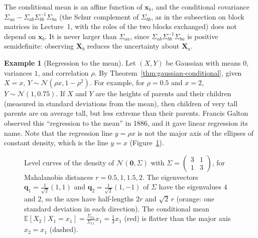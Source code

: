 \documentclass[11pt]{article}
\newcommand{\E}{\mathbb{E}}
\theoremstyle{definition}
\newtheorem{example}[definition]{Example}
\theoremstyle{plain}
\theoremstyle{remark}
\begin{document}
The conditional mean is an affine function of $\mathbf{x}_b$, and the conditional covariance $\Sigma_{aa} - \Sigma_{ab}\Sigma_{bb}^{-1}\Sigma_{ba}$ (the Schur complement of $\Sigma_{bb}$, as in the subsection on block matrices in Lecture~1, with the roles of the two blocks exchanged) does not depend on $\mathbf{x}_b$. It is never larger than $\Sigma_{aa}$, since $\Sigma_{ab}\Sigma_{bb}^{-1}\Sigma_{ba}$ is positive semidefinite: observing $\mathbf{X}_b$ reduces the uncertainty about $\mathbf{X}_a$.

\begin{example}[Regression to the mean]\label{ex:regression-to-mean}
    Let $(X, Y)$ be Gaussian with means $0$, variances $1$, and correlation $\rho$. By Theorem~\ref{thm:gaussian-conditional}, given $X = x$, $Y \sim \mathcal{N}(\rho x, 1 - \rho^2)$. For example, for $\rho = 0.5$ and $x = 2$, $Y \sim \mathcal{N}(1, 0.75)$. If $X$ and $Y$ are the heights of parents and their children (measured in standard deviations from the mean), then children of very tall parents are on average tall, but less extreme than their parents. Francis Galton observed this ``regression to the mean'' in 1886, and it gave linear regression its name. Note that the regression line $y = \rho x$ is not the major axis of the ellipses of constant density, which is the line $y = x$ (Figure~\ref{fig:gaussian}).
\end{example}

\begin{figure}[ht]
    \centering
    \caption{Level curves of the density of $\mathcal{N}(\mathbf{0}, \Sigma)$ with $\Sigma = \left(\begin{smallmatrix} 3 & 1 \\ 1 & 3 \end{smallmatrix}\right)$, for Mahalanobis distances $r = 0.5, 1, 1.5, 2$. The eigenvectors $\mathbf{q}_1 = \frac{1}{\sqrt{2}}(1, 1)$ and $\mathbf{q}_2 = \frac{1}{\sqrt{2}}(1, -1)$ of $\Sigma$ have the eigenvalues $4$ and $2$, so the axes have half-lengths $2r$ and $\sqrt{2}\,r$ (orange: one standard deviation in each direction). The conditional mean $\E[X_2 \mid X_1 = x_1] = \frac{\Sigma_{21}}{\Sigma_{11}}x_1 = \frac{1}{3}x_1$ (red) is flatter than the major axis $x_2 = x_1$ (dashed).}
    \label{fig:gaussian}
\end{figure}
\end{document}
